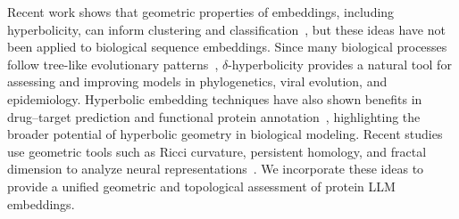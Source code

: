 \documentclass[]{Liebert_Author_revised}
\begin{document}
Recent work shows that geometric properties of embeddings, including hyperbolicity, can inform clustering and classification~\citeauthor{yang2024enhancing}, but these ideas have not been applied to biological sequence embeddings. Since many biological processes follow tree-like evolutionary patterns~\citeauthor{felsenstein2004inferring, abu2016metric}, $\delta$-hyperbolicity provides a natural tool for assessing and improving models in phylogenetics, viral evolution, and epidemiology. Hyperbolic embedding techniques have also shown benefits in drug–target prediction and functional protein annotation~\citeauthor{dress2012basic, ali2023protein}, highlighting the broader potential of hyperbolic geometry in biological modeling.
Recent studies use geometric tools such as Ricci curvature, persistent homology, and fractal dimension to analyze neural representations~\citeauthor{ni2015ricci, carlsson2009topology, facco2017estimating}. We incorporate these ideas to provide a unified geometric and topological assessment of protein LLM embeddings.
\end{document}
